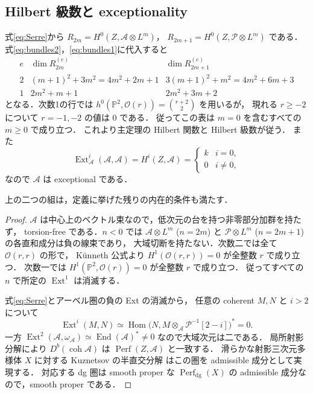 \subsection{Hilbert 級数と exceptionality}

式\eqref{eq:Serre}から
$R_{2m}=H^0(Z,\mathcal A\otimes L^m)$，
$R_{2m+1}=H^0(Z,\mathcal P\otimes L^m)$ である．
式\eqref{eq:bundles2}，\eqref{eq:bundles1}に代入すると
\[
\begin{array}{c|cc}
 e&\dim R^{(e)}_{2m}&\dim R^{(e)}_{2m+1}\\ \hline
2&(m+1)^2+3m^2=4m^2+2m+1&
3(m+1)^2+m^2=4m^2+6m+3\\
1&2m^2+m+1&2m^2+3m+2
\end{array}
\]
となる．次数1の行では
$h^0(\mathbb P^2,\mathcal O(r))=\binom{r+2}{2}$ を用いるが，
現れる $r\ge-2$ について $r=-1,-2$ の値は $0$ である．
従ってこの表は $m=0$ を含むすべての $m\ge0$ で成り立つ．
これより主定理の Hilbert 関数と Hilbert 級数が従う．
また
\[
 \operatorname{Ext}^i_{\mathcal A}(\mathcal A,\mathcal A)=H^i(Z,\mathcal A)
 =\begin{cases}k&i=0,\\0&i\ne0,\end{cases}
\]
なので $\mathcal A$ は exceptional である．

\begin{proposition}
\label{prop:intrinsic-completion}
上の二つの組は，定義に挙げた残りの内在的条件も満たす．
\end{proposition}
\begin{proof}
$\mathcal A$ は中心上のベクトル束なので，低次元の台を持つ非零部分加群を持たず，
torsion-free である．$n<0$ では
$\mathcal A\otimes L^m$ ($n=2m$) と
$\mathcal P\otimes L^m$ ($n=2m+1$) の各直和成分は負の線束であり，
大域切断を持たない．次数二では全て $\mathcal O(r,r)$ の形で，
K\"unneth 公式より $H^1(\mathcal O(r,r))=0$ が全整数 $r$ で成り立つ．
次数一では $H^1(\mathbb P^2,\mathcal O(r))=0$ が全整数 $r$ で成り立つ．
従ってすべての $n$ で所定の $\operatorname{Ext}^1$ は消滅する．

式\eqref{eq:Serre}とアーベル圏の負の Ext の消滅から，
任意の coherent $M,N$ と $i>2$ について
\[
 \operatorname{Ext}^i(M,N)
 \simeq\operatorname{Hom}\bigl(N,M\otimes_{\mathcal A}\mathcal P^{-1}[2-i]\bigr)^*=0.
\]
一方 $\operatorname{Ext}^2(\mathcal A,\omega_{\mathcal A})
\simeq\operatorname{End}(\mathcal A)^*\ne0$ なので大域次元は二である．
局所射影分解により $D^b(\operatorname{coh}\mathcal A)$ は
$\operatorname{Perf}(Z,\mathcal A)$ と一致する．
滑らかな射影三次元多様体 $X$ に対する Kuznetsov の半直交分解
\cite[Theorem~4.2]{KuznetsovQuadric} はこの圏を admissible 成分として実現する．
対応する dg 圏は smooth proper な $\operatorname{Perf}_{\mathrm{dg}}(X)$ の
admissible 成分なので，smooth proper である．
\end{proof}

